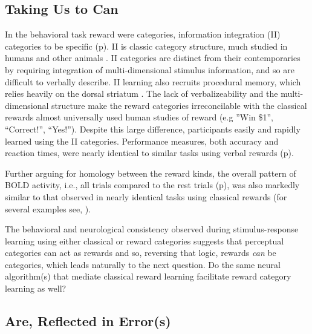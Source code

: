 \documentclass[doc,12pt]{apa}        %
\begin{document}
\subsection{Taking Us to Can}
\label{sub:tocan}
In the behavioral task reward were categories, information integration (II) categories to be specific (p\pageref{subsub:whatwhen}).  II is classic category structure, much studied in humans and other animals \cite{Smith:2011p9101,Ashby:2011p9148,Smith:2010p9713}.  II categories are distinct from their contemporaries by requiring integration of multi-dimensional stimulus information, and so are difficult to verbally describe. II learning also recruits procedural memory, which relies heavily on the dorsal striatum \cite{Ashby:1998p9716}.   The lack of verbalizeability and the multi-dimensional structure make the reward categories irreconcilable with the classical rewards almost universally used human studies of reward (e.g ''Win \$1'', ``Correct!'', ``Yes!'').  Despite this large difference, participants easily and rapidly learned using the II categories.  Performance measures, both accuracy and reaction times, were nearly identical to similar tasks using verbal rewards (p\pageref{subsub:wellbehaved}).  

Further arguing for homology between the reward kinds, the overall pattern of BOLD activity, i.e., all trials compared to the rest trials (p\pageref{sub:blob}), was also markedly similar to that observed in nearly identical tasks using classical rewards (for several examples see, ).

The behavioral and neurological consistency observed during stimulus-response learning using either classical or reward categories suggests that perceptual categories can act as rewards and so, reversing that logic, rewards \emph{can} be categories, which leads naturally to the next question. Do the same neural algorithm(s) that mediate classical reward learning facilitate reward category learning as well?

\subsection{Are, Reflected in Error(s)}
\label{sub:inerror}
\end{document}

